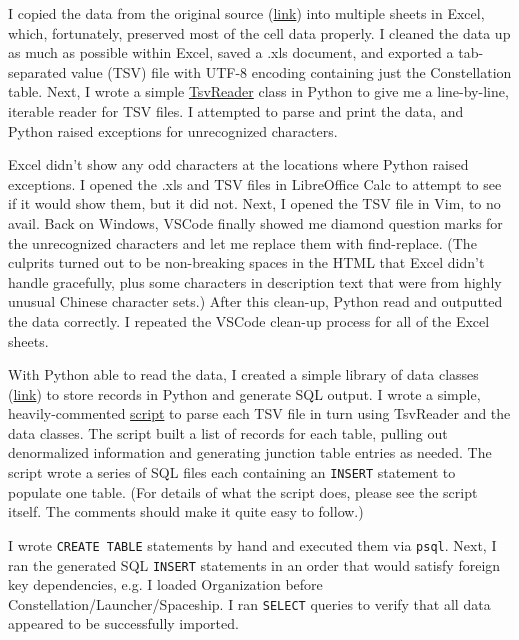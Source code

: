 \documentclass{article}
\begin{document}
I copied the data from the original source (\href{https://www.newspace.im/index.html}{link}) into multiple sheets in Excel, which, fortunately, preserved most of the cell data properly. I cleaned the data up as much as possible within Excel, saved a .xls document, and exported a tab-separated value (TSV) file with UTF-8 encoding containing just the Constellation table. Next, I wrote a simple \href{https://github.com/edev/CS586FinalProject/blob/master/python/reader/tsvreader.py}{TsvReader} class in Python to give me a line-by-line, iterable reader for TSV files. I attempted to parse and print the data, and Python raised exceptions for unrecognized characters.

Excel didn't show any odd characters at the locations where Python raised exceptions. I opened the .xls and TSV files in LibreOffice Calc to attempt to see if it would show them, but it did not. Next, I opened the TSV file in Vim, to no avail. Back on Windows, VSCode finally showed me diamond question marks for the unrecognized characters and let me replace them with find-replace. (The culprits turned out to be non-breaking spaces in the HTML that Excel didn't handle gracefully, plus some characters in description text that were from highly unusual Chinese character sets.) After this clean-up, Python read and outputted the data correctly. I repeated the VSCode clean-up process for all of the Excel sheets.

With Python able to read the data, I created a simple library of data classes (\href{https://github.com/edev/CS586FinalProject/tree/master/python/dataclass}{link}) to store records in Python and generate SQL output. I wrote a simple, heavily-commented \href{https://github.com/edev/CS586FinalProject/blob/master/python/main.py}{script} to parse each TSV file in turn using TsvReader and the data classes. The script built a list of records for each table, pulling out denormalized information and generating junction table entries as needed. The script wrote a series of SQL files each containing an \texttt{INSERT} statement to populate one table. (For details of what the script does, please see the script itself. The comments should make it quite easy to follow.)

I wrote \texttt{CREATE TABLE} statements by hand and executed them via \texttt{psql}. Next, I ran the generated SQL \texttt{INSERT} statements in an order that would satisfy foreign key dependencies, e.g. I loaded Organization before Constellation/Launcher/Spaceship. I ran \texttt{SELECT} queries to verify that all data appeared to be successfully imported.
\end{document}
